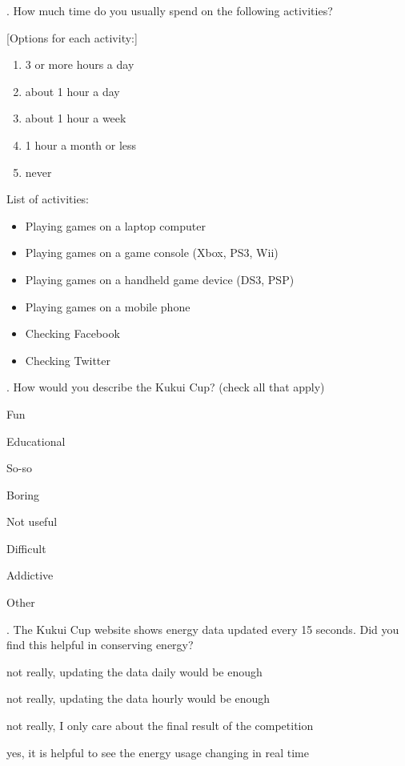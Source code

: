 \vspace{5 mm}
. How much time do you usually spend on the following activities?

[Options for each activity:]

\begin{enumerate}
	\item 3 or more hours a day
	\item about 1 hour a day
	\item about 1 hour a week
	\item 1 hour a month or less
	\item never
\end{enumerate}

\noindent
List of activities:

\begin{itemize}
	\item Playing games on a laptop computer
	\item Playing games on a game console (Xbox, PS3, Wii)
	\item Playing games on a handheld game device (DS3, PSP)
	\item Playing games on a mobile phone
	\item Checking Facebook
	\item Checking Twitter
\end{itemize}

\vspace{5 mm}
. How would you describe the Kukui Cup? (check all that apply)

\begin{checkbox}
	\item Fun
	\item Educational
	\item So-so
	\item Boring
	\item Not useful
	\item Difficult
	\item Addictive
	\item Other
\end{checkbox}

\vspace{5 mm}
. The Kukui Cup website shows energy data updated every 15 seconds. Did you find this helpful in conserving energy?

\begin{radiobutton}
	\item not really, updating the data daily would be enough
	\item not really, updating the data hourly would be enough
	\item not really, I only care about the final result of the competition
	\item yes, it is helpful to see the energy usage changing in real time
\end{radiobutton}

